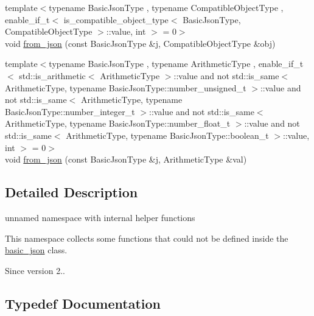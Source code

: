 \begin{DoxyCompactItemize}
\item 
{\footnotesize template$<$typename Basic\+Json\+Type , typename Compatible\+Object\+Type , enable\+\_\+if\+\_\+t$<$ is\+\_\+compatible\+\_\+object\+\_\+type$<$ Basic\+Json\+Type, Compatible\+Object\+Type $>$\+::value, int $>$  = 0$>$ }\\void \mbox{\hyperlink{namespacenlohmann_1_1detail_a5e7a3674e8ac46f8feebad9712d7c55f}{from\+\_\+json}} (const Basic\+Json\+Type \&j, Compatible\+Object\+Type \&obj)
\item 
{\footnotesize template$<$typename Basic\+Json\+Type , typename Arithmetic\+Type , enable\+\_\+if\+\_\+t$<$ std\+::is\+\_\+arithmetic$<$ Arithmetic\+Type $>$\+::value and not std\+::is\+\_\+same$<$ Arithmetic\+Type, typename Basic\+Json\+Type\+::number\+\_\+unsigned\+\_\+t $>$\+::value and not std\+::is\+\_\+same$<$ Arithmetic\+Type, typename Basic\+Json\+Type\+::number\+\_\+integer\+\_\+t $>$\+::value and not std\+::is\+\_\+same$<$ Arithmetic\+Type, typename Basic\+Json\+Type\+::number\+\_\+float\+\_\+t $>$\+::value and not std\+::is\+\_\+same$<$ Arithmetic\+Type, typename Basic\+Json\+Type\+::boolean\+\_\+t $>$\+::value, int $>$  = 0$>$ }\\void \mbox{\hyperlink{namespacenlohmann_1_1detail_a839b0ab50d2c9bce669068f56bc41202}{from\+\_\+json}} (const Basic\+Json\+Type \&j, Arithmetic\+Type \&val)
\end{DoxyCompactItemize}


\subsection{Detailed Description}
unnamed namespace with internal helper functions 

This namespace collects some functions that could not be defined inside the \mbox{\hyperlink{classnlohmann_1_1basic__json}{basic\+\_\+json}} class.

\begin{DoxySince}{Since}
version 2.. 
\end{DoxySince}


\subsection{Typedef Documentation}
\mbox{\label{namespacenlohmann_1_1detail_a02bcbc878bee413f25b985ada771aa9c}} 
